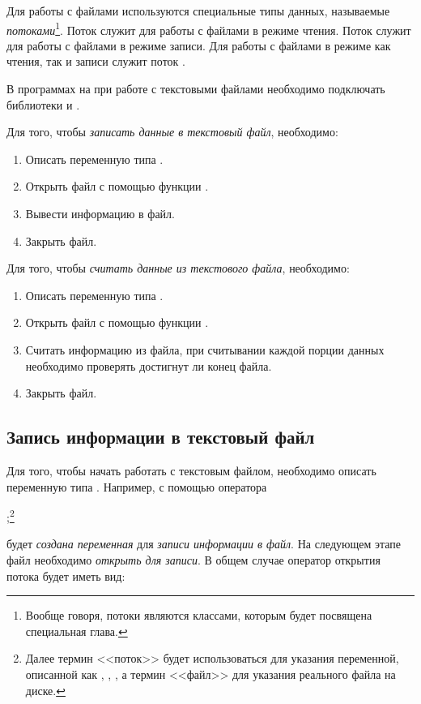 Для работы с файлами используются специальные типы данных, называемые
\emph{потоками}\footnote{Вообще говоря, потоки являются классами, которым будет посвящена
специальная глава.}. Поток  служит для работы с файлами в режиме чтения. Поток
 служит для работы с файлами в режиме записи. Для работы с файлами в режиме как чтения, так
и записи служит поток .

В программах на  при работе с текстовыми файлами необходимо подключать библиотеки  и
.

Для того, чтобы \emph{записать данные в текстовый файл}, необходимо:
\begin{enumerate}
\item Описать переменную типа .
\item Открыть файл с помощью функции .
\item Вывести информацию в файл.
\item Закрыть файл.
\end{enumerate}

Для того, чтобы \emph{считать данные из текстового файла}, необходимо:
\begin{enumerate}
\item Описать переменную типа .
\item Открыть файл с помощью функции .
\item Считать информацию из файла, при считывании каждой порции данных необходимо проверять достигнут ли конец файла.
\item Закрыть файл.
\end{enumerate}

\subsection[Запись информации в текстовый файл]{Запись информации в текстовый файл}
Для того, чтобы начать работать с текстовым файлом, необходимо описать переменную типа .
Например, с помощью оператора

;\footnote{Далее термин <<поток>> будет использоваться для указания переменной,
описанной как , , , а термин <<файл>> для указания реального файла на диске.}

будет \emph{создана переменная}  для \emph{записи
информации в файл}. На следующем этапе файл необходимо
\emph{открыть для записи}. В общем случае оператор открытия потока
будет иметь вид:

